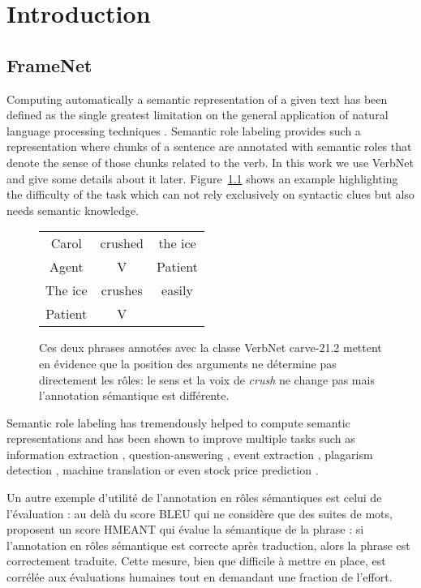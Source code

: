 \chapter{Introduction}
\label{ch:srlintro}

\section{FrameNet}
\label{presentation_framenet}

Computing automatically a semantic representation of a given text has been
defined as the single greatest limitation on the general application of natural
language processing techniques \citep{dang1998investigating}. Semantic role
labeling provides such a representation where chunks of a sentence are
annotated with semantic roles that denote the sense of those chunks related to
the verb. In this work we use VerbNet \citep{kipperschuler2005verbnet} and give
some details about it later. Figure~\ref{fig:example_srl} shows an example
highlighting the difficulty of the task which can not rely exclusively on
syntactic clues but also needs semantic knowledge.

\begin{figure}[ht]
    \centering
    \begin{tabular}{ccc}
        \toprule
        Carol & crushed   & the ice \\
        Agent & V         & Patient \\
        \midrule
        The ice & crushes & easily  \\
        Patient & V       &         \\
        \bottomrule
    \end{tabular}
    \caption{\label{fig:example_srl}Ces deux phrases annotées avec la classe VerbNet carve-21.2 mettent en évidence que la position des arguments ne détermine pas directement les rôles: le sens et la voix de \textit{crush} ne change pas mais l'annotation sémantique est différente.}
\end{figure}

Semantic role labeling has tremendously helped to compute semantic
representations and has been shown to improve multiple tasks such as
information extraction \citep{surdeanu2003using}, question-answering
\citep{shen2007using}, event extraction \citep{exner2011using}, plagarism
detection \citep{osman2012improved}, machine translation
\citep{bazrafshan2013semantic} or even stock price prediction
\citep{xie2013semantic}.

Un autre exemple d'utilité de l'annotation en rôles sémantiques est celui de
l'évaluation : au delà du score BLEU qui ne considère que des suites de mots,
\cite{lo2011smt} proposent un score HMEANT qui évalue la sémantique de la
phrase : si l'annotation en rôles sémantique est correcte après traduction,
alors la phrase est correctement traduite. Cette mesure, bien que difficile à
mettre en place, est corrélée aux évaluations humaines tout en demandant une
fraction de l'effort.


